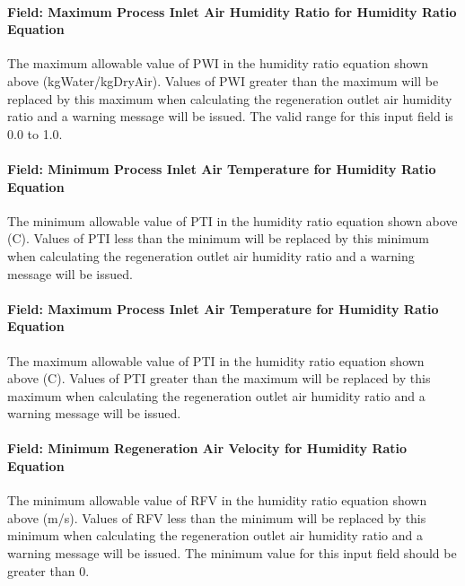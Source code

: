 \paragraph{Field: Maximum Process Inlet Air Humidity Ratio for Humidity Ratio Equation}\label{field-maximum-process-inlet-air-humidity-ratio-for-humidity-ratio-equation}

The maximum allowable value of PWI in the humidity ratio equation shown above (kgWater/kgDryAir). Values of PWI greater than the maximum will be replaced by this maximum when calculating the regeneration outlet air humidity ratio and a warning message will be issued. The valid range for this input field is 0.0 to 1.0.

\paragraph{Field: Minimum Process Inlet Air Temperature for Humidity Ratio Equation}\label{field-minimum-process-inlet-air-temperature-for-humidity-ratio-equation}

The minimum allowable value of PTI in the humidity ratio equation shown above (C). Values of PTI less than the minimum will be replaced by this minimum when calculating the regeneration outlet air humidity ratio and a warning message will be issued.

\paragraph{Field: Maximum Process Inlet Air Temperature for Humidity Ratio Equation}\label{field-maximum-process-inlet-air-temperature-for-humidity-ratio-equation}

The maximum allowable value of PTI in the humidity ratio equation shown above (C). Values of PTI greater than the maximum will be replaced by this maximum when calculating the regeneration outlet air humidity ratio and a warning message will be issued.

\paragraph{Field: Minimum Regeneration Air Velocity for Humidity Ratio Equation}\label{field-minimum-regeneration-air-velocity-for-humidity-ratio-equation}

The minimum allowable value of RFV in the humidity ratio equation shown above (m/s). Values of RFV less than the minimum will be replaced by this minimum when calculating the regeneration outlet air humidity ratio and a warning message will be issued. The minimum value for this input field should be greater than 0.

